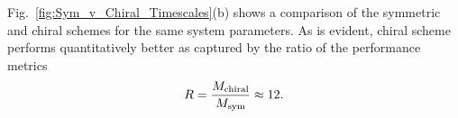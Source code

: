 %
\par
%
Fig.~\ref{fig:Sym_v_Chiral_Timescales}(b) shows a comparison of the symmetric and chiral schemes for the same system parameters. As is evident, chiral scheme performs quantitatively better as captured by the ratio of the performance metrics 
%
\begin{eqnarray}
    R = \frac{M_{\rm chiral}}{M_{\rm sym}} \approx 12.
\end{eqnarray}
%